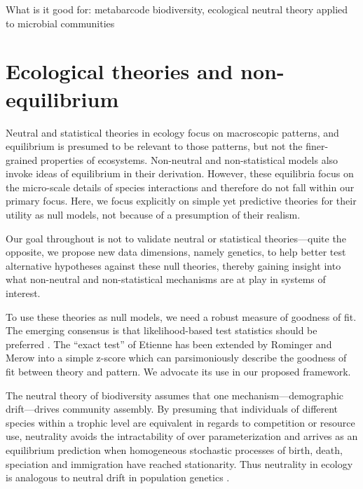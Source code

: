 \documentclass[12pt]{article}
\begin{document}
What is it good for: metabarcode biodiversity, ecological neutral
theory applied to microbial communities \citep{venkataraman2015}

\section{Ecological theories and non-equilibrium}

Neutral and statistical theories in ecology focus on macroscopic
patterns, and equilibrium is presumed to be relevant to those
patterns, but not the finer-grained properties of
ecosystems. Non-neutral and non-statistical models
\citep[e.g.,][]{tilman2004, chesson2000} also invoke ideas of
equilibrium in their derivation. However, these equilibria focus on
the micro-scale details of species interactions and therefore do not
fall within our primary focus.  Here, we focus explicitly on simple
yet predictive theories for their utility as null models, not because
of a presumption of their realism.

Our goal throughout is not to validate neutral or statistical
theories---quite the opposite, we propose new data dimensions, namely
genetics, to help better test alternative hypotheses against these
null theories, thereby gaining insight into what non-neutral and
non-statistical mechanisms are at play in systems of interest.

To use these theories as null models, we need a robust measure of
goodness of fit. The emerging consensus is that likelihood-based test
statistics should be preferred \citep{baldridge2016}. The ``exact
test'' of Etienne \citep{etienne2007} has been extended by Rominger
and Merow \citep{meteR} into a simple z-score which can parsimoniously
describe the goodness of fit between theory and pattern.  We advocate
its use in our proposed framework.

The neutral theory of biodiversity \citep[NTB;][]{hubbell2001}
assumes that one mechanism---demographic drift---drives community
assembly. By presuming that individuals of different species within a
trophic level are equivalent in regards to competition or resource
use, neutrality avoids the intractability of over parameterization and
arrives as an equilibrium prediction when homogeneous stochastic
processes of birth, death, speciation and immigration have reached
stationarity. Thus neutrality in ecology is analogous to neutral drift
in population genetics \citep{hubbell2001}.
\end{document}
